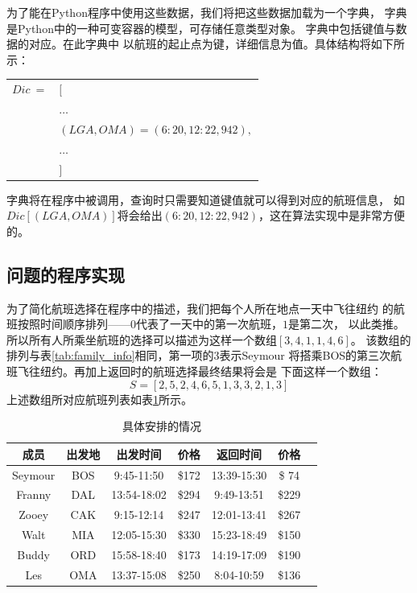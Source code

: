 \documentclass[fontset=fandol,a4paper,zihao=5]{ctexart}
\begin{document}
      为了能在Python程序中使用这些数据，我们将把这些数据加载为一个字典，
      字典是Python中的一种可变容器的模型，可存储任意类型对象。
      字典中包括键值与数据的对应。在此字典中
      以航班的起止点为键，详细信息为值。具体结构将如下所示：
			\begin{table}[!htbp]
				\centering
				\begin{tabular}{rl}
					$Dic\ = $ &$[$ \\
					&$\dots$ \\
					&$(LGA,OMA)=(6:20,12:22,942),$ \\
					&$\dots$\\
					&$]$
				\end{tabular} 
			\end{table}
			字典将在程序中被调用，查询时只需要知道键值就可以得到对应的航班信息，
            如$Dic[(LGA,OMA)]$将会给出$(6:20,12:22,942)$，这在算法实现中是非常方便的。
		\subsection{问题的程序实现}
			\label{sec:pdesc}
			为了简化航班选择在程序中的描述，我们把每个人所在地点一天中飞往纽约
            的航班按照时间顺序排列——$0$代表了一天中的第一次航班，$1$是第二次，
            以此类推。所以所有人所乘坐航班的选择可以描述为这样一个数组$[3,4,1,1,4,6]$。
            该数组的排列与表\ref{tab:family_info}相同，第一项的$3$表示Seymour
            将搭乘BOS的第三次航班飞往纽约。再加上返回时的航班选择最终结果将会是
            下面这样一个数组：
            \[S=[2,5,2,4,6,5,1,3,3,2,1,3]\]
			上述数组所对应航班列表如表\ref{tab:S_detail}所示。
			\begin{table}[!htbp]
				\centering
				\caption{具体安排的情况}
				\label{tab:S_detail}
				\begin{tabular}{ccccccc}
					\toprule[1pt]
					成员     & 出发地& 出发时间    &  价格  &  返回时间    &   价格 \\
					\midrule
					Seymour  & BOS &  9:45-11:50 & \$172 & 13:39-15:30 & \$ 74 \\
					Franny   & DAL & 13:54-18:02 & \$294 &  9:49-13:51 & \$229 \\
					Zooey    & CAK &  9:15-12:14 & \$247 & 12:01-13:41 & \$267 \\
					Walt     & MIA & 12:05-15:30 & \$330 & 15:23-18:49 & \$150 \\
					Buddy    & ORD & 15:58-18:40 & \$173 & 14:19-17:09 & \$190 \\
					Les      & OMA & 13:37-15:08 & \$250 &  8:04-10:59 & \$136 \\ 
					\bottomrule[1pt]
				\end{tabular} 
			\end{table}
			
\end{document}
